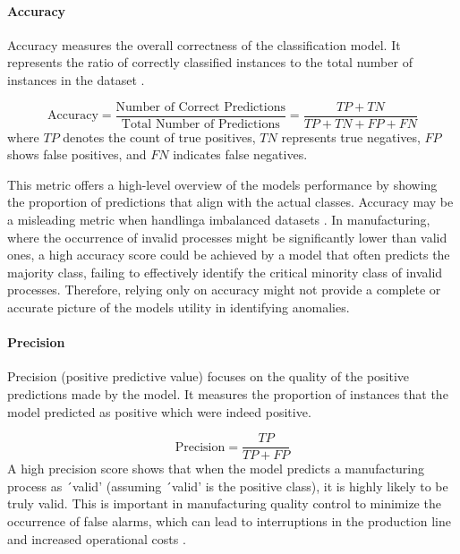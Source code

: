 \paragraph{\textbf{Accuracy}}
Accuracy measures the overall correctness of the classification model. It represents the ratio of correctly classified instances to the total number of instances in the dataset \autocite{fahrmeir2016statistik}.


\begin{equation}
    \label{eq:accuracy}
    \text{Accuracy} = \frac{\text{Number of Correct Predictions}}{\text{Total Number of Predictions}} = \frac{TP + TN}{TP + TN + FP + FN}
\end{equation}
where $TP$ denotes the count of true positives, $TN$ represents true negatives, $FP$ shows false positives, and $FN$ indicates false negatives.

This metric offers a high-level overview of the models performance by showing the proportion of predictions that align with the actual classes. Accuracy may be a misleading metric when handlinga imbalanced datasets \autocite{fahrmeir2016statistik}. In manufacturing, where the occurrence of invalid processes might be significantly lower than valid ones, a high accuracy score could be achieved by a model that often predicts the majority class, failing to effectively identify the critical minority class of invalid processes. Therefore, relying only on accuracy might not provide a complete or accurate picture of the models utility in identifying anomalies.

\paragraph{\textbf{Precision}}
Precision (positive predictive value) focuses on the quality of the positive predictions made by the model. It measures the proportion of instances that the model predicted as positive which were indeed positive.

\begin{equation}
    \label{eq:precision}
    \text{Precision} = \frac{TP}{TP + FP}
\end{equation}
A high precision score shows that when the model predicts a manufacturing process as ´valid' (assuming ´valid' is the positive class), it is highly likely to be truly valid. This is important in manufacturing quality control to minimize the occurrence of false alarms, which can lead to interruptions in the production line and increased operational costs \autocite{kharitonov2022comparative}.

